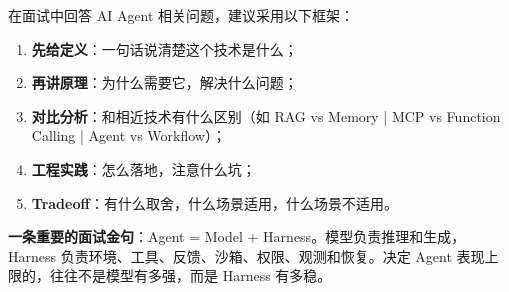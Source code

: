 \documentclass[9pt,a4paper,twocolumn]{ctexart}
\begin{document}
在面试中回答 AI Agent 相关问题，建议采用以下框架：


\begin{enumerate}[itemsep=1pt, topsep=2pt]
  \item \textbf{先给定义}：一句话说清楚这个技术是什么；
  \item \textbf{再讲原理}：为什么需要它，解决什么问题；
  \item \textbf{对比分析}：和相近技术有什么区别（如 RAG vs Memory | MCP vs Function Calling | Agent vs Workflow）；
  \item \textbf{工程实践}：怎么落地，注意什么坑；
  \item \textbf{Tradeoff}：有什么取舍，什么场景适用，什么场景不适用。
\end{enumerate}


\textbf{一条重要的面试金句}：Agent = Model + Harness。模型负责推理和生成，Harness 负责环境、工具、反馈、沙箱、权限、观测和恢复。决定 Agent 表现上限的，往往不是模型有多强，而是 Harness 有多稳。
\end{document}
